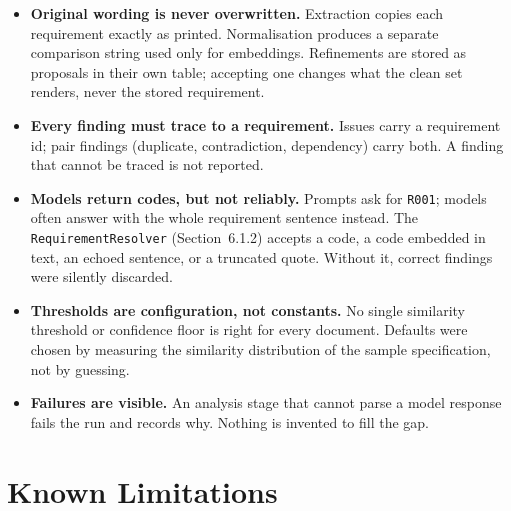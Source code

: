 \documentclass[11pt,a4paper]{article}
\begin{document}
\begin{itemize}[leftmargin=1.4em]
  \item \textbf{Original wording is never overwritten.} Extraction copies
        each requirement exactly as printed. Normalisation produces a
        separate comparison string used only for embeddings. Refinements
        are stored as proposals in their own table; accepting one changes
        what the clean set renders, never the stored requirement.
  \item \textbf{Every finding must trace to a requirement.} Issues carry a
        requirement id; pair findings (duplicate, contradiction,
        dependency) carry both. A finding that cannot be traced is not
        reported.
  \item \textbf{Models return codes, but not reliably.} Prompts ask for
        \texttt{R001}; models often answer with the whole requirement
        sentence instead. The \texttt{RequirementResolver} (Section~6.1.2)
        accepts a code, a code embedded in text, an echoed sentence, or a
        truncated quote. Without it, correct findings were silently
        discarded.
  \item \textbf{Thresholds are configuration, not constants.} No single
        similarity threshold or confidence floor is right for every
        document. Defaults were chosen by measuring the similarity
        distribution of the sample specification, not by guessing.
  \item \textbf{Failures are visible.} An analysis stage that cannot parse a
        model response fails the run and records why. Nothing is invented
        to fill the gap.
\end{itemize}

\section{Known Limitations}
\end{document}
